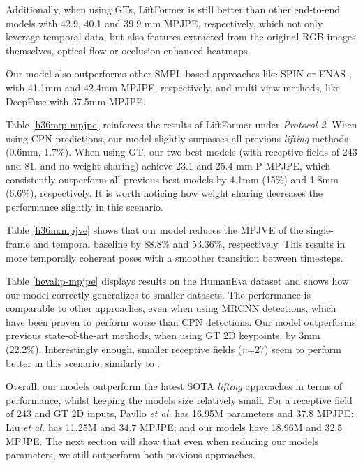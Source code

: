 \documentclass[letterpaper]{article}
\begin{document}
Additionally, when using GTs, LiftFormer is still better than other end-to-end models \cite{cheng19, cheng20, zhou19} with 42.9, 40.1 and 39.9 mm MPJPE, respectively, which not only leverage temporal data, but also features extracted from the original RGB images themselves, optical flow or occlusion enhanced heatmaps. 

Our model also outperforms other SMPL-based approaches like SPIN \cite{kolotouros19} or ENAS \cite{pham20}, with 41.1mm and 42.4mm MPJPE, respectively, and multi-view methods, like DeepFuse \cite{huang20} with 37.5mm MPJPE.

Table \ref{h36m:p-mpjpe} reinforces the results of LiftFormer under \textit{Protocol 2}. When using CPN predictions, our model slightly surpasses all previous \textit{lifting} methods \cite{liu20} (0.6mm, 1.7\%). When using GT, our two best models (with receptive fields of 243 and 81, and no weight sharing) achieve 23.1 and 25.4 mm P-MPJPE, which consistently outperform all previous best models \cite{pavllo19} by 4.1mm (15\%) and 1.8mm (6.6\%), respectively. It is worth noticing how weight sharing decreases the performance slightly in this scenario.

Table \ref{h36m:mpjve} shows that our model reduces the MPJVE of the single-frame and temporal baseline \cite{pavllo19} by 88.8\% and 53.36\%, respectively. This results in more temporally coherent poses with a smoother transition between timesteps.

Table \ref{heval:p-mpjpe} displays results on the HumanEva dataset and shows how our model correctly generalizes to smaller datasets. The performance is comparable to other approaches, even when using MRCNN detections, which have been proven to perform worse than CPN detections. Our model outperforms previous state-of-the-art methods, when using GT 2D keypoints, by 3mm (22.2\%). Interestingly enough, smaller receptive fields (\textit{n}=27) seem to perform better in this scenario, similarly to \cite{liu20}.


Overall, our models outperform the latest SOTA \textit{lifting} approaches in terms of performance, whilst keeping the models size relatively small. For a receptive field of 243 and GT 2D inputs, Pavllo \textit{et al.} \cite{pavllo19} has 16.95M parameters and 37.8 MPJPE:  Liu \textit{et al.} \cite{liu20} has 11.25M and 34.7 MPJPE; and our models have 18.96M and 32.5 MPJPE. The next section will show that even when reducing our models parameters, we still outperform both previous approaches.
\end{document}
